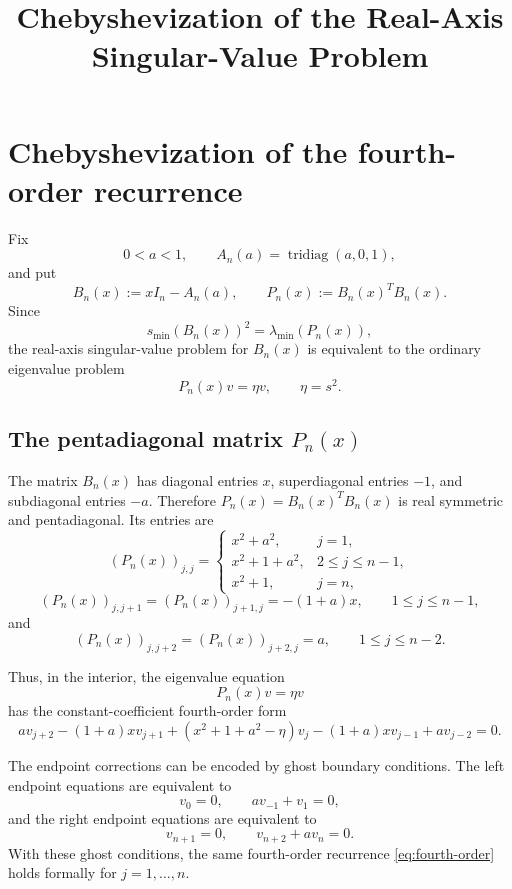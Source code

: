 \documentclass[11pt]{amsart}
\title{Chebyshevization of the Real-Axis Singular-Value Problem}
\author{}
\numberwithin{equation}{section}
\begin{document}
\maketitle

\section{Chebyshevization of the fourth-order recurrence}

Fix
\[
        0<a<1,
        \qquad
        A_n(a)=\operatorname{tridiag}(a,0,1),
\]
and put
\[
        B_n(x):=xI_n-A_n(a),
        \qquad
        P_n(x):=B_n(x)^TB_n(x).
\]
Since
\[
        s_{\min}(B_n(x))^2
        =
        \lambda_{\min}(P_n(x)),
\]
the real-axis singular-value problem for \(B_n(x)\) is equivalent to the
ordinary eigenvalue problem
\[
        P_n(x)v=\eta v,
        \qquad \eta=s^2.
\]

\subsection{The pentadiagonal matrix \(P_n(x)\)}

The matrix \(B_n(x)\) has diagonal entries \(x\), superdiagonal entries
\(-1\), and subdiagonal entries \(-a\).  Therefore \(P_n(x)=B_n(x)^TB_n(x)\)
is real symmetric and pentadiagonal.  Its entries are
\[
        (P_n(x))_{j,j}
        =
        \begin{cases}
        x^2+a^2, & j=1,\\
        x^2+1+a^2, & 2\le j\le n-1,\\
        x^2+1, & j=n,
        \end{cases}
\]
\[
        (P_n(x))_{j,j+1}
        =
        (P_n(x))_{j+1,j}
        =
        -(1+a)x,
        \qquad 1\le j\le n-1,
\]
and
\[
        (P_n(x))_{j,j+2}
        =
        (P_n(x))_{j+2,j}
        =
        a,
        \qquad 1\le j\le n-2.
\]

Thus, in the interior, the eigenvalue equation
\[
        P_n(x)v=\eta v
\]
has the constant-coefficient fourth-order form
\begin{equation}\label{eq:fourth-order}
        a v_{j+2}
        -(1+a)xv_{j+1}
        +(x^2+1+a^2-\eta)v_j
        -(1+a)xv_{j-1}
        +a v_{j-2}
        =
        0 .
\end{equation}

The endpoint corrections can be encoded by ghost boundary conditions.  The
left endpoint equations are equivalent to
\begin{equation}\label{eq:left-ghost}
        v_0=0,
        \qquad
        av_{-1}+v_1=0,
\end{equation}
and the right endpoint equations are equivalent to
\begin{equation}\label{eq:right-ghost}
        v_{n+1}=0,
        \qquad
        v_{n+2}+av_n=0.
\end{equation}
With these ghost conditions, the same fourth-order recurrence
\eqref{eq:fourth-order} holds formally for \(j=1,\dots,n\).
\end{document}

